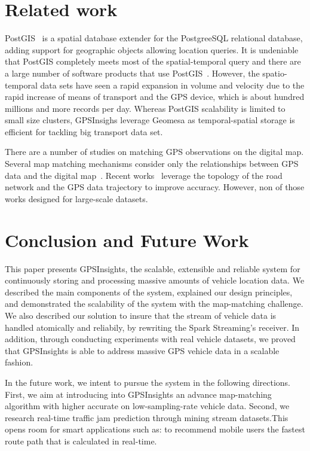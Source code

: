 \documentclass{acm_proc_article-sp}
\begin{document}
\section{Related work}

PostGIS~\cite{posgis} is a spatial database extender for the PostgreeSQL relational database, adding support for geographic objects allowing location queries. It is undeniable that PostGIS completely meets most of the spatial-temporal query and there are a large number of software products that use PostGIS~\cite{backendposgis}. However, the spatio-temporal data sets have seen a rapid expansion in volume and velocity due to the rapid increase of means of transport and the GPS device, which is about hundred millions and more records per day. Whereas PostGIS scalability is limited to small size clusters, GPSInsighs leverage Geomesa as temporal-spatial storage is efficient for tackling big transport data set.

There are a number of studies on matching GPS observations on the digital map. Several map matching mechanisms consider only the relationships between GPS data and the digital map~\cite{noh1998map}. Recent works~\cite{yang2005map} leverage the topology of the road network and the GPS data trajectory to improve accuracy. However, non of those works designed for large-scale datasets.  

\section{Conclusion and Future Work}

This paper presents GPSInsights, the scalable, extensible and reliable system for continuously storing and processing massive amounts of vehicle location data. We described the main components of the system, explained our design principles, and demonstrated the scalability of the system with the map-matching challenge. We also described our solution to insure that the stream of vehicle data is handled atomically and reliabily, by rewriting the Spark Streaming's receiver. In addition, through conducting experiments with real vehicle datasets, we proved that GPSInsights is able to address massive GPS vehicle data in a scalable fashion.

In the future work, we intent to pursue the system in the following directions. First, we aim at introducing into GPSInsights an advance map-matching algorithm with higher accurate on low-sampling-rate vehicle data. Second, we research real-time traffic jam prediction through mining stream datasets.This opens room for smart applications such as: to recommend mobile users the fastest route path that is calculated in real-time.
\end{document}
